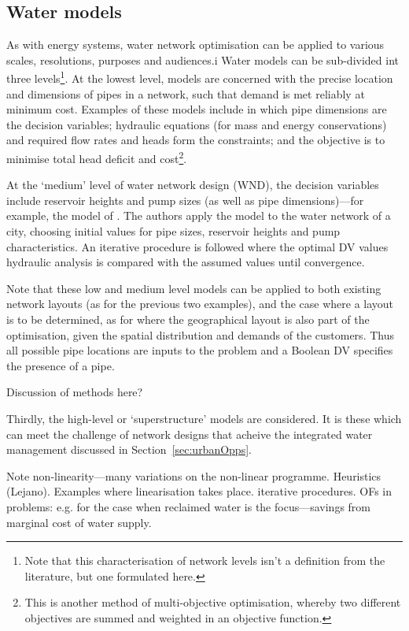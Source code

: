 \subsection{Water models}
As with energy systems, water network optimisation can be applied to various scales, resolutions, purposes and audiences.i Water models can be sub-divided int three levels\footnote{Note that this characterisation of network levels isn't a definition from the literature, but one formulated here.}. At the lowest level, models are concerned with the precise location and dimensions of pipes in a network, such that demand is met reliably at minimum cost. Examples of these models include \citet{Keedwell2005} in which pipe dimensions are the decision variables; hydraulic equations (for mass and energy conservations) and required flow rates and heads form the constraints; and the objective is to minimise total head deficit and cost\footnote{This is another method of multi-objective optimisation, whereby two different objectives are summed and weighted in an objective function.}. 

At the `medium' level of water network design (WND), the decision variables include reservoir heights and pump sizes (as well as pipe dimensions)---for example, the model of \citet{Zangenah2010}. The authors apply the model to the water network of a city, choosing initial values for pipe sizes, reservoir heights and pump characteristics. An iterative procedure is followed where the optimal DV values hydraulic analysis is compared with the assumed values until convergence.

Note that these low and medium level models can be applied to both existing network layouts (as for the previous two examples), and the case where a layout is to be determined, as for \citet{Lejano2006} where the geographical layout is also part of the optimisation, given the spatial distribution and demands of the customers. Thus all possible pipe locations are inputs to the problem and a Boolean DV specifies the presence of a pipe. 

Discussion of methods here?

Thirdly, the high-level or `superstructure' models are considered. It is these which can meet the challenge of network designs that acheive the integrated water management discussed in Section~\ref{sec:urbanOpps}.

Note non-linearity---many variations on the non-linear programme.
Heuristics (Lejano).
Examples where linearisation takes place. 
iterative procedures.
OFs in problems: e.g. for the case when reclaimed water is the focus---savings from marginal cost of water supply.

